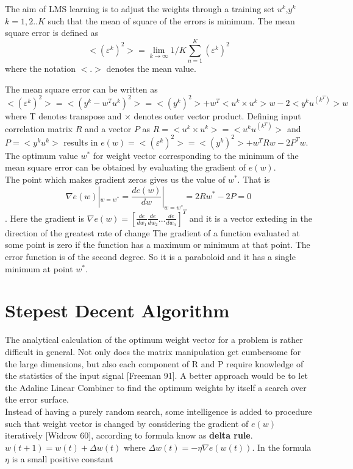 \documentclass[12pt, a4paper, twoside]{book}
\begin{document}
The aim of LMS learning is to adjust the weights through a training set {{$u^k$,$y^k$}} $k=1,2..K$ such that the mean of square of the errors is minimum.
The mean square error is defined as 
\[<(\varepsilon^k)^2>= \lim_{k \to \infty} 1/K \sum_{n = 1}^{K}(\varepsilon^k)^2\] where the notation $<.>$ denotes the mean value. 

The mean square error can be written as $<(\varepsilon^k)^2> = <(y^k - w^Tu^k)^2> = <(y^k)^2> + w^T <u^k\times u^k> w - 2 <y^ku^(k^T)> w$ where T denotes transpose and $\times$ denotes outer vector product.
Defining input correlation matrix $R$ and a vector $P$ as $R = <u^k\times u^k> = <u^ku^(k^T)>$ and $P = <y^ku^k>$ results in $e(w)=<(\varepsilon^k)^2> = <(y^k)^2> + w^TRw - 2P^Tw$. 
The optimum value $w^*$ for weight vector corresponding to the minimum of the mean square error can be obtained by evaluating the gradient of $e(w)$. \\

The point which makes gradient zeros gives us the value of $w^*$. That is 
\[\nabla e(w)|_{w=w^*} = \frac{d e(w)}{d w}|_{w=w^*} = 2Rw^* - 2P = 0 \]. Here the gradient is $\nabla e(w) = [ \frac{d e}{ d w_1} \frac{d e}{ d w_2} ... \frac{d e}{ d w_n} ]^T$ and it is a vector exteding in the direction of the greatest rate of change
The gradient of a function evaluated at some point is zero if the function has a maximum or minimum at that point. 
The error function is of the second degree. So it is a paraboloid and it has a single minimum at point $w^*$.

\section{Stepest Decent Algorithm}
The analytical calculation of the optimum weight vector for a problem is rather difficult in general. Not only does the matrix manipulation get cumbersome for the large dimensions, but also
each component of R and P require knowledge of the statistics of the input signal [Freeman 91]. A better approach would be to let the Adaline Linear Combiner to find the optimum weights by itself a search over the error surface. \\

Instead of having a purely random search, some intelligence is added to procedure such that weight vector is changed by considering the gradient of $e(w)$ iteratively [Widrow 60], according to formula know as \textbf{delta rule}. $w(t+1)=w(t)+\Delta w(t)$ where $\Delta w(t) = - \eta\nabla e(w(t)) $. In the formula $\eta$ is a small positive constant \\
\end{document}
